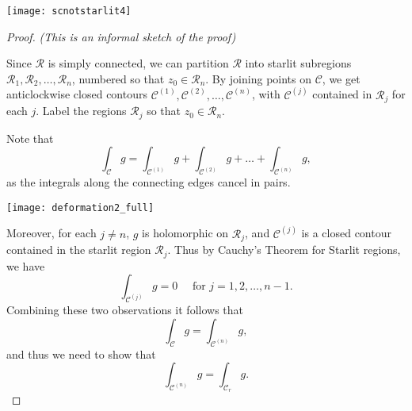\begin{center}
\texttt{[image: scnotstarlit4]}
\end{center}

\begin{proof}\emph{(This is an informal sketch of the proof)}

Since $\mathcal{R}$ is simply connected,  we can partition $\mathcal{R}$ into starlit subregions $\mathcal{R}_1,\mathcal{R}_2,\ldots, \mathcal{R}_n$, numbered so that $z_0 \in \mathcal{R}_n$. By joining points on $\mathcal{C}$, we get anticlockwise closed contours $\mathcal{C}^{(1)},\mathcal{C}^{(2)},\ldots,\mathcal{C}^{(n)}$, with $\mathcal{C}^{(j)}$ contained in $\mathcal{R}_j$ for each $j$.  Label the regions $\mathcal{R}_j$ so that $z_0 \in \mathcal{R}_n$. 


Note that
\[
\int_{\mathcal{C}} g = \int_{\mathcal{C}^{(1)}} g + \int_{\mathcal{C}^{(2)}} g + \ldots + \int_{\mathcal{C}^{(n)}} g,
\]
as the integrals along the connecting edges cancel in pairs.

\begin{center}
\texttt{[image: deformation2\_full]}
\end{center}

Moreover, for each $j \neq n$, $g$ is holomorphic on $\mathcal{R}_j$, and $\mathcal{C}^{(j)}$ is a closed contour contained in the starlit region $\mathcal{R}_j$.  Thus by Cauchy's Theorem for Starlit regions, we have
\[
\int_{\mathcal{C}^{(j)}} g = 0\quad \text{ for } j=1,2,\ldots,n-1.
\]
Combining these two observations it follows that
\[
\int_{\mathcal{C}} g = \int_{\mathcal{C}^{(n)}} g,
\]
and thus we need to show that
\[
\int_{\mathcal{C}^{(n)}}g = \int_{\mathcal{C}_r} g.
\]


\end{proof}
